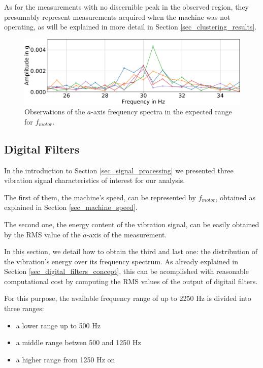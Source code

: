 \documentclass[conference]{IEEEtran}
\begin{document}
As for the measurements with no discernible peak in the observed region, they presumably represent measurements acquired when the machine was not operating, as will be explained in more detail in Section \ref{sec_clustering_results}.

\begin{figure}[htbp]
\centerline{\includegraphics[width=\columnwidth]{graphics/motor_frequency/motor_frequency.pdf}}
\caption{Observations of the $a$-axis frequency spectra in the expected range for $f_{motor}$.}
\label{fig_motor_frequency}
\end{figure}



\subsection{Digital Filters}

In the introduction to Section \ref{sec_signal_processing} we presented three vibration signal characteristics of interest for our analysis. 

The first of them, the machine's speed, can be represented by $f_{motor}$, obtained as explained in Section \ref{sec_machine_speed}. 

The second one, the energy content of the vibration signal, can be easily obtained by the RMS value of the $a$-axis of the measurement.

In this section, we detail how to obtain the third and last one: the distribution of the vibration's energy over its frequency spectrum. As already explained in Section \ref{sec_digital_filters_concept}, this can be acomplished with reasonable computational cost by computing the RMS values of the output of digitail filters.

For this purpose, the available frequency range of up to 2250 Hz is divided into three ranges:

\begin{itemize}
	\item a lower range up to 500 Hz
	\item a middle range betwen 500 and 1250 Hz
	\item a higher range from 1250 Hz on
\end{itemize}
\end{document}

